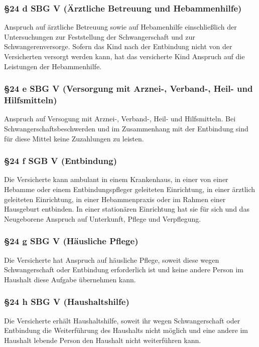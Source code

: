 \documentclass[a4paper, 12pt]{report}
\begin{document}
\begin{multicols}{2}
\subsubsection{\S 24 d SBG V (Ärztliche Betreuung und Hebammenhilfe)}

Anspruch auf ärztliche Betreuung sowie auf Hebamenhilfe einschließlich der
Untersuchungen zur Feststellung der Schwangerschaft und zur Schwangerenversorge.
Sofern das Kind nach der Entbindung nicht von der Versicherten versorgt werden
kann, hat das versicherte Kind Anspruch auf die Leistungen der Hebammenhilfe.

\subsubsection{\S 24 e SBG V (Versorgung mit Arznei-, Verband-, Heil- und
Hilfsmitteln)}

Anspruch auf Versogung mit Arznei-, Verband-, Heil- und Hilfsmitteln. Bei
Schwangerschaftsbeschwerden und im Zusammenhang mit der Entbindung sind für
diese Mittel keine Zuzahlungen zu leisten.

\subsubsection{\S 24 f SGB V (Entbindung)}

Die Versicherte kann ambulant in einem Krankenhaus, in einer von einer Hebamme
oder einem Entbindungspfleger geleiteten Einrichtung, in einer ärztlich
geleiteten Einrichtung, in einer Hebammenpraxis oder im Rahmen einer Hausgeburt
entbinden. In einer stationären Einrichtung hat sie für sich und das
Neugeborene Anspruch auf Unterkunft, Pflege und Verpflegung.

\subsubsection{\S 24 g SBG V (Häusliche Pflege)}

Die Versicherte hat Anspruch auf häusliche Pflege, soweit diese wegen
Schwangerschaft oder Entbindung erforderlich ist und keine andere Person im
Haushalt diese Aufgabe übernehmen kann.

\subsubsection{\S 24 h SBG V (Haushaltshilfe)}

Die Versicherte erhält Haushaltshilfe, soweit ihr wegen Schwangerschaft oder
Entbindung die Weiterführung des Haushalts nicht möglich und eine andere im
Haushalt lebende Person den Haushalt nicht weiterführen kann.


\end{multicols}
\end{document}
